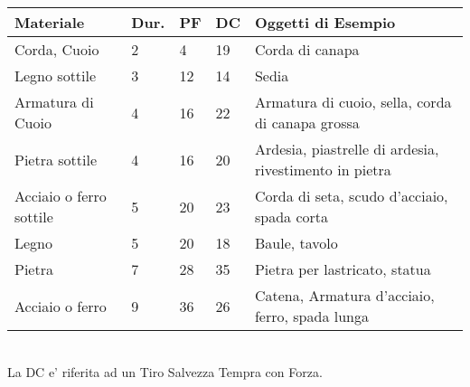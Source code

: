 \documentclass[landscape,10pt,a4paper]{article}
\begin{document}
\begin{multicols}{3}
\begin{dmbox}[title=Modificatori d'Attacco e Difesa - pagina \pageref{modificatoriattaccodifesaparticolari}]
\end{dmbox}


\end{multicols}




\begin{multicols}{2}





\begin{dmbox}[title=Spaccare - pagina \pageref{durezzaoggetti}]

\noindent\begin{tabularx}{1\linewidth}{llllX}
\textbf{Materiale} &\textbf{Dur.}&\textbf{PF} &\textbf{DC} & \textbf{Oggetti di Esempio}\\
\toprule{}
Corda, Cuoio&2&4&19&Corda di canapa\\
Legno sottile&3&12&14&Sedia\\
Armatura di Cuoio &4&16&22&Armatura di cuoio, sella, corda di canapa grossa\\
Pietra sottile&4&16&20&Ardesia, piastrelle di ardesia, rivestimento in pietra\\
Acciaio o ferro sottile&5&20&23&Corda di seta, scudo d'acciaio, spada corta\\
Legno&5&20&18&Baule, tavolo\\
Pietra&7&28&35&Pietra per lastricato, statua\\
Acciaio o ferro&9&36&26&Catena, Armatura d'acciaio, ferro, spada lunga\\
\end{tabularx}\\

La DC e' riferita ad un Tiro Salvezza Tempra con Forza.

\end{dmbox}




\begin{dmbox}[title=Oggetti e Viveri - pagina \pageref{equipaggiamentolista}]


\end{dmbox}
\end{multicols}
\end{document}
